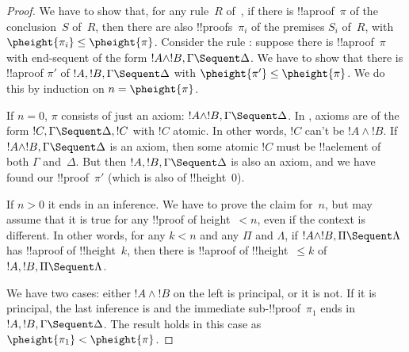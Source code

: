 \documentclass[../../../include/open-logic-section]{subfiles}
\begin{document}
\begin{proof}
We have to show that, for any rule~$R$ of~, if there is
!!a{proof}~$\pi$ of the conclusion~$S$ of~$R$, then there are also
!!{proof}s~$\pi_i$ of the premises $S_i$ of~$R$, with $\pheight{\pi_i}
\le \pheight{\pi}$. Consider the rule \LeftR{\land}: suppose there is
!!a{proof}~$\pi$ with end-sequent of the form $!A \land !B, \Gamma
\Sequent \Delta$. We have to show that there is !!a{proof} $\pi'$ of
$!A, !B, \Gamma \Sequent \Delta$ with $\pheight{\pi'} \le
\pheight{\pi}$. We do this by induction on $n = \pheight{\pi}$.

If $n = 0$, $\pi$ consists of just an axiom: $!A \land !B, \Gamma
\Sequent \Delta$. In , axioms are of the form $!C, \Gamma
\Sequent \Delta, !C$ with $!C$ atomic. In other words, $!C$ can't be
$!A \land !B$. If $!A \land !B, \Gamma \Sequent \Delta$ is an axiom,
then some atomic $!C$ must be !!a{element} of both $\Gamma$
and~$\Delta$. But then $!A, !B, \Gamma \Sequent \Delta$ is also an
axiom, and we have found our !!{proof}~$\pi'$ (which is also of
!!{height}~$0$).

If $n>0$ it ends in an inference. We have to prove the claim for~$n$,
but may assume that it is true for any !!{proof} of height~$<n$, even
if the context is different. In other words, for any $k<n$ and any
$\Pi$ and $\Lambda$, if $!A \land !B, \Pi \Sequent \Lambda$ has
!!a{proof} of !!{height}~$k$, then there is !!a{proof} of
!!{height}~$\le k$ of $!A, !B, \Pi \Sequent \Lambda$.

We have two cases: either $!A \land
!B$ on the left is principal, or it is not. If it is principal, the
last inference is \LeftR{\land} and the immediate
sub-!!{proof}~$\pi_1$ ends in $!A, !B, \Gamma \Sequent \Delta$. The
result holds in this case as $\pheight{\pi_1} < \pheight{\pi}$.


\end{proof}
\end{document}
